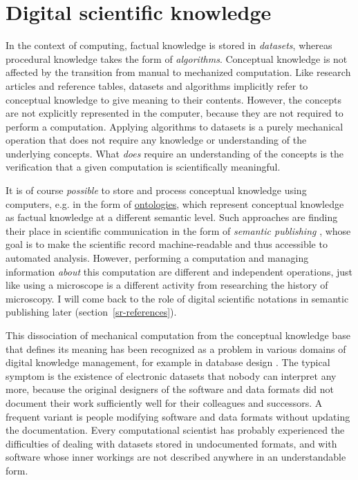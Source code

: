 \section{Digital scientific knowledge}
\label{digital}

In the context of computing, factual knowledge is stored in \textit{datasets}, whereas procedural knowledge takes the form of \textit{algorithms}. Conceptual knowledge is not affected by the transition from manual to mechanized computation. Like research articles and reference tables, datasets and algorithms implicitly refer to conceptual knowledge to give meaning to their contents. However, the concepts are not explicitly represented in the computer, because they are not required to perform a computation. Applying algorithms to datasets is a purely mechanical operation that does not require any knowledge or understanding of the underlying concepts. What \textit{does} require an understanding of the concepts is the verification that a given computation is scientifically meaningful.

It is of course \textit{possible} to store and process conceptual knowledge using computers, e.g. in the form of \href{http://en.wikipedia.org/wiki/Ontology_\%28information_science\%29}{ontologies}, which represent conceptual knowledge as factual knowledge at a different semantic level. Such approaches are finding their place in scientific communication in the form of \textit{semantic publishing} \cite{shotton_semantic_2009}, whose goal is to make the scientific record machine-readable and thus accessible to automated analysis. However, performing a computation and managing information \textit{about} this computation are different and independent operations, just like using a microscope is a different activity from researching the history of microscopy. I will come back to the role of digital scientific notations in semantic publishing later (section~\ref{sr-references}).

This dissociation of mechanical computation from the conceptual knowledge base that defines its meaning has been recognized as a problem in various domains of digital knowledge management, for example in database design \cite{borgida_data_2004}. The typical symptom is the existence of electronic datasets that nobody can interpret any more, because the original designers of the software and data formats did not document their work sufficiently well for their colleagues and successors. A frequent variant is people modifying software and data formats without updating the documentation. Every computational scientist has probably experienced the difficulties of dealing with datasets stored in undocumented formats, and with software whose inner workings are not described anywhere in an understandable form.

